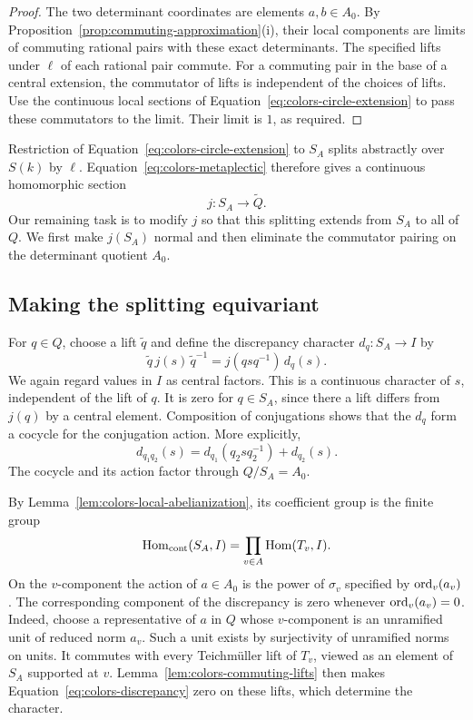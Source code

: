 \begin{proof}
The two determinant coordinates are elements $a,b\in A_0$.  By
Proposition~\ref{prop:commuting-approximation}\textup{(i)}, their local
components are limits of commuting rational pairs with these exact
determinants.  The specified lifts under $\ell$ of each rational pair
commute.  For a commuting pair in the base of a central extension, the
commutator of lifts is independent of the choices of lifts.  Use the
continuous local sections of Equation~\eqref{eq:colors-circle-extension}
to pass these commutators to the limit.  Their limit is $1$, as required.
\end{proof}

Restriction of Equation~\eqref{eq:colors-circle-extension} to $S_A$
splits abstractly over $S(k)$ by $\ell$.  Equation~\eqref{eq:colors-metaplectic}
therefore gives a continuous homomorphic section
\[
 j:S_A\longrightarrow\widetilde Q.
\]
Our remaining task is to modify $j$ so that this splitting extends from
$S_A$ to all of $Q$.  We first make $j(S_A)$ normal and then eliminate
the commutator pairing on the determinant quotient $A_0$.

\subsection{Making the splitting equivariant}

For $q\in Q$, choose a lift $\widetilde q$ and define the discrepancy
character $d_q:S_A\to I$ by
\begin{equation}\label{eq:colors-discrepancy}
 \widetilde q\,j(s)\,\widetilde q^{-1}
   =j(qsq^{-1})\,d_q(s).
\end{equation}
We again regard values in $I$ as central factors.  This is a continuous
character of $s$, independent of the lift of $q$.  It is zero for
$q\in S_A$, since there a lift differs from $j(q)$ by a central element.
Composition of conjugations shows that the $d_q$ form a cocycle for the
conjugation action.  More explicitly,
\[
 d_{q_1q_2}(s)=d_{q_1}(q_2sq_2^{-1})+d_{q_2}(s).
\]
The cocycle and its action factor through $Q/S_A=A_0$.

By Lemma~\ref{lem:colors-local-abelianization}, its coefficient group is
the finite group
\[
 \operatorname{Hom}_{\mathrm{cont}}(S_A,I)
   =\prod_{v\in A}\operatorname{Hom}(T_v,I).
\]
On the $v$-component the action of $a\in A_0$ is the power of $\sigma_v$
specified by $\operatorname{ord}_v(a_v)$.  The corresponding component of the
discrepancy is zero whenever $\operatorname{ord}_v(a_v)=0$.  Indeed, choose a
representative of $a$ in $Q$ whose $v$-component is an unramified unit
of reduced norm $a_v$.  Such a unit exists by surjectivity of unramified
norms on units.  It commutes with every Teichm\"uller lift of $T_v$,
viewed as an element of $S_A$ supported at $v$.  Lemma~\ref{lem:colors-commuting-lifts}
then makes Equation~\eqref{eq:colors-discrepancy} zero on these lifts,
which determine the character.

